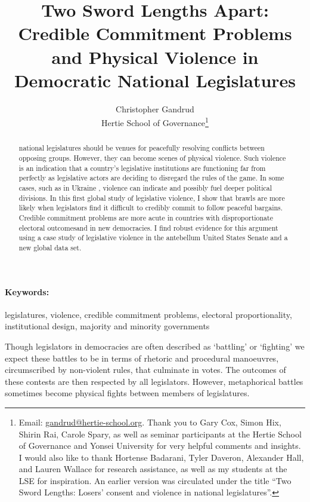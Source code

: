 \documentclass[a4paper]{article}\usepackage[]{graphicx}\usepackage[]{color}
\title{Two Sword Lengths Apart: Credible Commitment Problems and Physical Violence in Democratic National Legislatures}
\author{Christopher Gandrud \\
                Hertie School of Governance\footnote{Email: \href{mailto:gandrud@hertie-school.org}{gandrud@hertie-school.org}. Thank you to Gary Cox, Simon Hix, Shirin Rai, Carole Spary, as well as seminar participants at the Hertie School of Governance and Yonsei University for very helpful comments and insights. I would also like to thank Hortense Badarani, Tyler Daveron, Alexander Hall, and Lauren Wallace for research assistance, as well as my students at the LSE for inspiration. An earlier version was circulated under the title ``Two Sword Lengths: Losers' consent and violence in national legislatures''.}}
\begin{document}
\maketitle

\begin{abstract}
 national legislatures should be venues for peacefully resolving conflicts between opposing groups. However, they can become scenes of physical violence. Such violence is an indication that a country's legislative institutions are functioning far from perfectly as legislative actors are deciding to disregard the rules of the game. In some cases, such as  in Ukraine , violence can indicate and possibly fuel deeper political divisions. In this first global study of legislative violence, I show that brawls are more likely when legislators find it difficult to credibly commit to follow peaceful bargains. Credible commitment problems are more acute in countries with disproportionate electoral outcomesand in new democracies. I find robust evidence for this argument using a case study of legislative violence in the antebellum United States Senate and a new global data set.
\end{abstract}


\paragraph{Keywords:} legislatures, violence, credible commitment problems, electoral proportionality, institutional design, majority and minority governments

\vspace{0.3cm}


Though legislators in democracies are often described as `battling' or `fighting' we expect these battles to be in terms of rhetoric and procedural manoeuvres, circumscribed by non-violent rules, that culminate in votes. The outcomes of these contests are then respected by all legislators. However, metaphorical battles sometimes become physical fights between members of legislatures.
\end{document}
